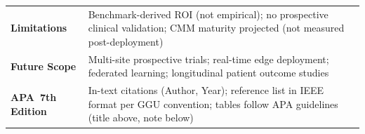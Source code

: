 \begin{table}[!htbp]
\begin{tabularx}{\textwidth}{@{} L L @{}}
\addlinespace
\textbf{Limitations} & Benchmark-derived ROI (not empirical); no prospective clinical validation; CMM maturity projected (not measured post-deployment) \\
\addlinespace
\textbf{Future Scope} & Multi-site prospective trials; real-time edge deployment; federated learning; longitudinal patient outcome studies \\
\addlinespace
\textbf{APA~7th Edition} & In-text citations (Author, Year); reference list in IEEE format per GGU convention; tables follow APA guidelines (title above, note below) \\
\bottomrule
\end{tabularx}
\end{table}

